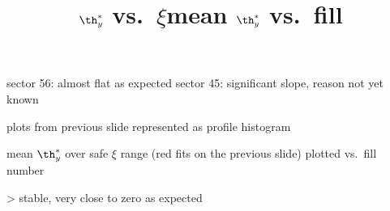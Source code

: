 \> sector 56: almost flat as expected
\> sector 45: significant slope, reason not yet known

\newpage %
\title{$\th^*_y$ vs.~$\xi$}

\> plots from previous slide represented as profile histogram

\centerline{}


\newpage %
\title{mean $\th^*_y$ vs.~fill}

\> mean $\th^*_y$ over safe $\xi$ range (red fits on the previous slide) plotted vs.~fill number

\centerline{}

\>> stable, very close to zero as expected

\vfil
\eject
\bye
